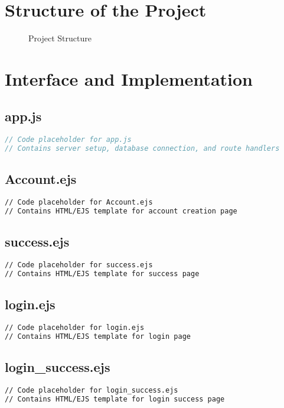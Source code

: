 \documentclass[12pt,a4paper]{report}
\begin{document}
\chapter{Structure of the Project}

\begin{figure}[h]
    \centering
    \caption{Project Structure}
\end{figure}

\chapter{Interface and Implementation}

\section{app.js}
\begin{lstlisting}[language=JavaScript]
// Code placeholder for app.js
// Contains server setup, database connection, and route handlers
\end{lstlisting}

\section{Account.ejs}
\begin{lstlisting}[language=HTML]
// Code placeholder for Account.ejs
// Contains HTML/EJS template for account creation page
\end{lstlisting}

\section{success.ejs}
\begin{lstlisting}[language=HTML]
// Code placeholder for success.ejs
// Contains HTML/EJS template for success page
\end{lstlisting}

\section{login.ejs}
\begin{lstlisting}[language=HTML]
// Code placeholder for login.ejs
// Contains HTML/EJS template for login page
\end{lstlisting}

\section{login\_success.ejs}
\begin{lstlisting}[language=HTML]
// Code placeholder for login_success.ejs
// Contains HTML/EJS template for login success page
\end{lstlisting}
\end{document}
